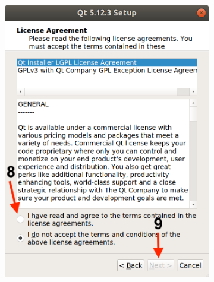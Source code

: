 \begin{figure}[H]
\begin{subfigure}{0.32\linewidth}
        \includegraphics[width=1\textwidth]{Images/Qt7.png}
    \end{subfigure}
    \begin{subfigure}{0.32\linewidth}

\end{subfigure}
\end{figure}
